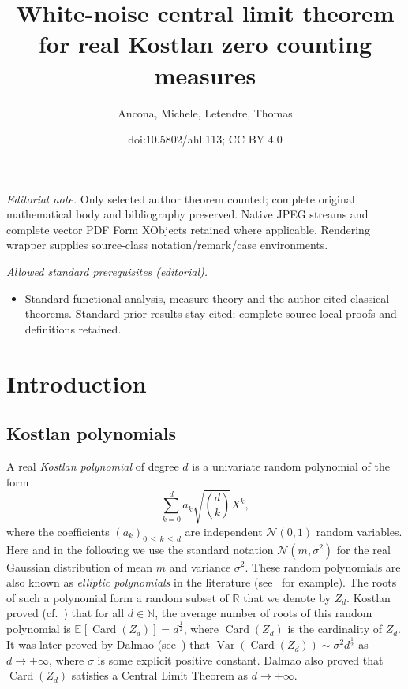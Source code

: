 \documentclass[10pt]{amsart}
\title{White-noise central limit theorem for real Kostlan zero counting measures}
\author{Ancona, Michele, Letendre, Thomas}
\date{doi:10.5802/ahl.113; CC BY 4.0}
\theoremstyle{definition}\newtheorem{defi}[theo]{Definition}\newtheorem{rema}[theo]{Remark}\newtheorem{exam}[theo]{Example}\newtheorem{exem}[theo]{Example}\newtheorem{nota}[theo]{Notation}
\DeclareMathOperator{\card}{Card}
\DeclareMathOperator{\Var}{Var}
\newcommand{\clN}{\mathcal{N}}
\newcommand{\N}{\mathbb{N}}
\newcommand{\R}{\mathbb{R}}
\newcommand{\esp}[2][]{\mathbb{E}_{#1}\!\left[#2 \right]}
\newcommand{\var}[1]{\Var\!\left(#1 \right)}
\renewcommand{\leq}{\leqslant}
\begin{document}
\maketitle
\noindent\textit{Editorial note.} Only selected author theorem counted; complete original mathematical body and bibliography preserved. Native JPEG streams and complete vector PDF Form XObjects retained where applicable. Rendering wrapper supplies source-class notation/remark/case environments.\par\medskip
\noindent\textit{Allowed standard prerequisites (editorial).}\begin{itemize}
\item Standard functional analysis, measure theory and the author-cited classical theorems. Standard prior results stay cited; complete source-local proofs and definitions retained.
\end{itemize}\medskip



\tableofcontents
\newpage


\section{Introduction}\label{sec introduction}

\subsection*{Kostlan polynomials}

A real \emph{Kostlan polynomial} of degree $d$ is a univariate random polynomial of the form
\[
\sum_{k=0}^d a_k \sqrt{\binom{d}{k}}X^k,
\]
where the coefficients $(a_k)_{0\,\leq\,k\,\leq\, d}$ are independent $\clN(0,1)$ random variables. Here and in the following we use the standard notation $\clN(m,\sigma^2)$ for the real Gaussian distribution of mean $m$ and variance $\sigma^2$. These random polynomials are also known as \emph{elliptic polynomials} in the literature (see~\cite{ST2004} for example). The roots of such a polynomial form a random subset of $\R$ that we denote by $Z_d$. Kostlan proved (cf.~\cite{Kos1993}) that for all $d \in \N$, the average number of roots of this random polynomial is $\esp{\card(Z_d)} = d^\frac{1}{2}$, where $\card(Z_d)$ is the cardinality of $Z_d$. It was later proved by Dalmao (see~\cite{Dal2015}) that $\var{\card(Z_d)} \sim \sigma^2 d^\frac{1}{2}$ as $d \to +\infty$, where $\sigma$ is some explicit positive constant. Dalmao also proved that $\card(Z_d)$ satisfies a Central Limit Theorem as $d \to +\infty$.
\end{document}
